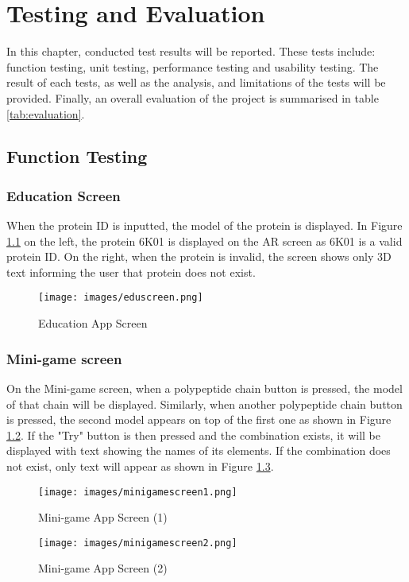 \chapter{Testing and Evaluation}
\label{ch:evaluation}

In this chapter, conducted test results will be reported. These tests include: function testing, unit testing, performance testing and usability testing. The result of each tests, as well as the analysis, and limitations of the tests will be provided. Finally, an overall evaluation of the project is summarised in table \ref{tab:evaluation}.

\section{Function Testing}
\subsection{Education Screen}
When the protein ID is inputted, the model of the protein is displayed.
In Figure \ref{fig:eduscreen} on the left, the protein 6K01 is displayed on the AR screen as 6K01 is a valid protein ID. On the right, when the protein is invalid, the screen shows only 3D text informing the user that protein does not exist.
 \begin{figure}[!htp]
	\centering
	\texttt{[image: images/eduscreen.png]}
	\caption{Education App Screen}
	\label{fig:eduscreen}
\end{figure}

\subsection{Mini-game screen}
On the Mini-game screen, when a polypeptide chain button is pressed, the model of that chain will be displayed. Similarly, when another polypeptide chain button is pressed, the second model appears on top of the first one as shown in Figure \ref{fig:minigamescreen1}. If the "Try" button is then pressed and the combination exists, it will be displayed with text showing the names of its elements. If the combination does not exist, only text will appear as shown in Figure \ref{fig:minigamescreen2}.
 \begin{figure}[!htp]
	\centering
	\texttt{[image: images/minigamescreen1.png]}
	\caption{Mini-game App Screen (1)}
	\label{fig:minigamescreen1}
\end{figure}

 \begin{figure}[!htp]
	\centering
	\texttt{[image: images/minigamescreen2.png]}
	\caption{Mini-game App Screen (2)}
	\label{fig:minigamescreen2}
\end{figure}

